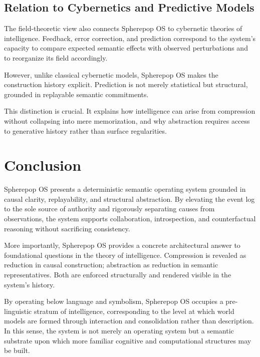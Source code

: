 \documentclass[11pt]{article}
\begin{document}
\subsection{Relation to Cybernetics and Predictive Models}

The field-theoretic view also connects Spherepop OS to cybernetic theories
of intelligence. Feedback, error correction, and prediction correspond to
the system’s capacity to compare expected semantic effects with observed
perturbations and to reorganize its field accordingly.

However, unlike classical cybernetic models, Spherepop OS makes the
construction history explicit. Prediction is not merely statistical but
structural, grounded in replayable semantic commitments.

This distinction is crucial. It explains how intelligence can arise from
compression without collapsing into mere memorization, and why abstraction
requires access to generative history rather than surface regularities.


\section{Conclusion}

Spherepop OS presents a deterministic semantic operating system grounded in
causal clarity, replayability, and structural abstraction. By elevating the
event log to the sole source of authority and rigorously separating causes
from observations, the system supports collaboration, introspection, and
counterfactual reasoning without sacrificing consistency.

More importantly, Spherepop OS provides a concrete architectural answer to
foundational questions in the theory of intelligence. Compression is revealed
as reduction in causal construction; abstraction as reduction in semantic
representatives. Both are enforced structurally and rendered visible in the
system’s history.

By operating below language and symbolism, Spherepop OS occupies a
pre-linguistic stratum of intelligence, corresponding to the level at which
world models are formed through interaction and consolidation rather than
description. In this sense, the system is not merely an operating system but
a semantic substrate upon which more familiar cognitive and computational
structures may be built.
\end{document}
